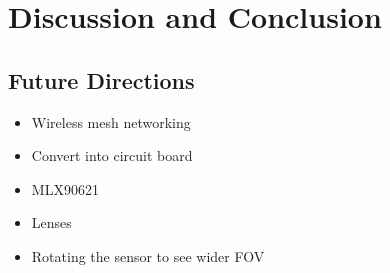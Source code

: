 \documentclass[../thesis/thesis.tex]{subfiles}
\begin{document}
 \chapter{Discussion and Conclusion}
 
\section{Future Directions}
\begin{itemize}
 \item Wireless mesh networking
 \item Convert into circuit board
 \item MLX90621
 \item Lenses
 \item Rotating the sensor to see wider FOV
\end{itemize}

 
\end{document}

